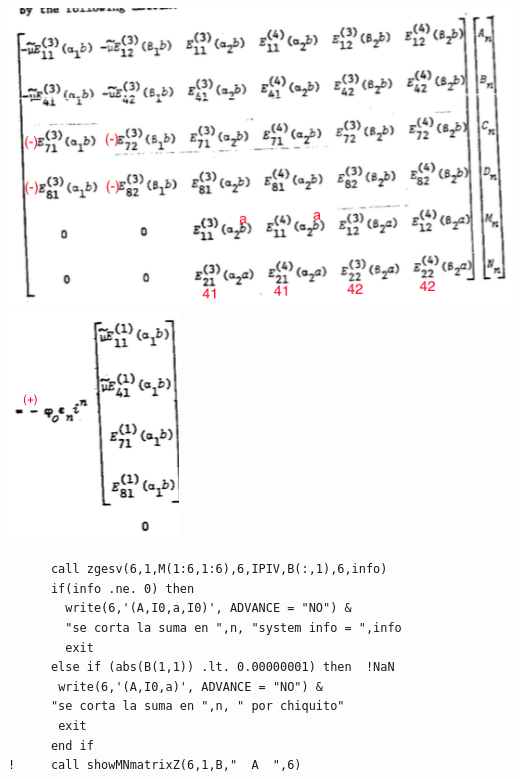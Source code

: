 \documentclass [11pt,spanish]{article}
\begin{document}
\endgroup
\includegraphics[scale=0.6]{matriz}
\includegraphics[scale=0.6]{termindep}
\begingroup
\fontsize{10pt}{12pt}
\selectfont
{}
\begin{shaded}
\begin{verbatim}
      call zgesv(6,1,M(1:6,1:6),6,IPIV,B(:,1),6,info)
      if(info .ne. 0) then
        write(6,'(A,I0,a,I0)', ADVANCE = "NO") &
        "se corta la suma en ",n, "system info = ",info
        exit
      else if (abs(B(1,1)) .lt. 0.00000001) then  !NaN
       write(6,'(A,I0,a)', ADVANCE = "NO") &
      "se corta la suma en ",n, " por chiquito"
       exit
      end if
!     call showMNmatrixZ(6,1,B,"  A  ",6)
\end{verbatim}
\end{shaded}
\endgroup
\end{document}
